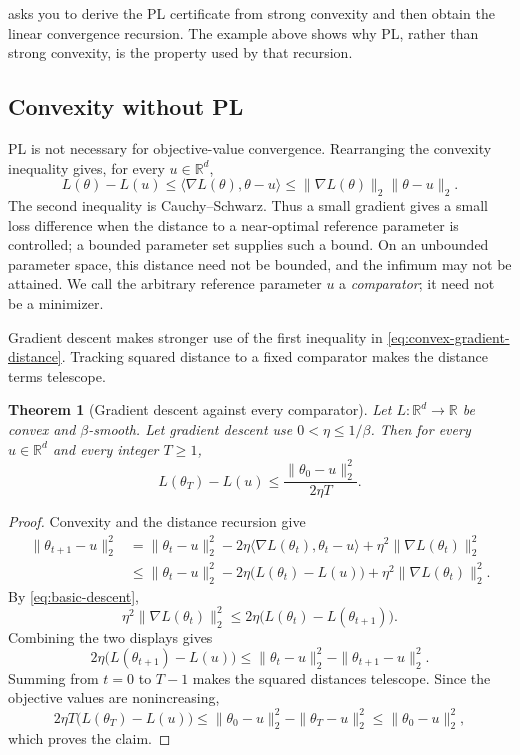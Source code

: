 \documentclass[11pt,twoside]{article}
\newcommand{\R}{\mathbb R}
\newtheorem{theorem}{Theorem}[section]
\theoremstyle{definition}
\theoremstyle{remark}
\begin{document}
 asks you to derive the PL certificate from
strong convexity and then obtain the linear convergence recursion. The
example above shows why PL, rather than strong convexity, is the property used
by that recursion.

\subsection{Convexity without PL}

PL is not necessary for objective-value convergence. Rearranging the
convexity inequality gives, for every $u\in\R^d$,
\begin{equation}
 L(\theta)-L(u)
 \le\langle\nabla L(\theta),\theta-u\rangle
 \le\|\nabla L(\theta)\|_2\|\theta-u\|_2.
 \label{eq:convex-gradient-distance}
\end{equation}
The second inequality is Cauchy--Schwarz. Thus a small gradient gives a small
loss difference when the distance to a near-optimal reference parameter is
controlled; a bounded parameter set supplies such a bound. On an unbounded
parameter space, this distance need not be bounded, and the infimum may not be
attained. We call the arbitrary reference parameter $u$ a \emph{comparator};
it need not be a minimizer.

Gradient descent makes stronger use of the first inequality in
\cref{eq:convex-gradient-distance}. Tracking squared distance to a fixed
comparator makes the distance terms telescope.

\begin{theorem}[Gradient descent against every comparator]
\label{thm:convex-comparator}
Let $L:\R^d\to\R$ be convex and $\beta$-smooth. Let gradient descent use
$0<\eta\le1/\beta$. Then for every $u\in\R^d$ and every integer $T\ge1$,
\begin{equation}
 L(\theta_T)-L(u)
 \le\frac{\|\theta_0-u\|_2^2}{2\eta T}.
 \label{eq:convex-comparator}
\end{equation}
\end{theorem}

\begin{proof}
Convexity and the distance recursion give
\begin{align*}
 \|\theta_{t+1}-u\|_2^2
 &=\|\theta_t-u\|_2^2
 -2\eta\langle\nabla L(\theta_t),\theta_t-u\rangle
 +\eta^2\|\nabla L(\theta_t)\|_2^2\\
 &\le\|\theta_t-u\|_2^2
 -2\eta\bigl(L(\theta_t)-L(u)\bigr)
 +\eta^2\|\nabla L(\theta_t)\|_2^2.
\end{align*}
By \cref{eq:basic-descent},
\[
 \eta^2\|\nabla L(\theta_t)\|_2^2
 \le2\eta\bigl(L(\theta_t)-L(\theta_{t+1})\bigr).
\]
Combining the two displays gives
\[
 2\eta\bigl(L(\theta_{t+1})-L(u)\bigr)
 \le\|\theta_t-u\|_2^2-\|\theta_{t+1}-u\|_2^2.
\]
Summing from $t=0$ to $T-1$ makes the squared distances telescope. Since the
objective values are nonincreasing,
\[
 2\eta T\bigl(L(\theta_T)-L(u)\bigr)
 \le \|\theta_0-u\|_2^2-\|\theta_T-u\|_2^2
 \le \|\theta_0-u\|_2^2,
\]
which proves the claim.
\end{proof}
\end{document}
